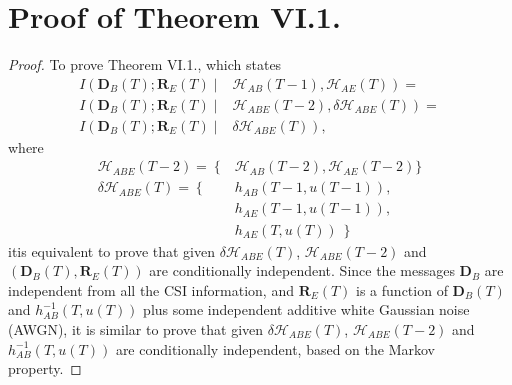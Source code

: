 \newpage
\section*{Proof of Theorem VI.1.}
\begin{proof}
To prove Theorem VI.1., which states
\begin{align*}
    I\left(\mathbf{D}_B(T);\mathbf{R}_E(T) \mid \right. & \left. \mathcal{H}_{AB}(T-1),\mathcal{H}_{AE}(T)\right) =  \nonumber \\
    I\left(\mathbf{D}_B(T);\mathbf{R}_E(T) \mid \right. & \left. \mathcal{H}_{ABE}\left(T-2\right), \delta \mathcal{H}_{ABE}(T) \right) = \nonumber \\
    I\left(\mathbf{D}_B(T);\mathbf{R}_E(T) \mid \right. & \left. \delta \mathcal{H}_{ABE}(T)\right),
\end{align*}
where 
\begin{align*}
\mathcal{H}_{ABE}(T-2) = \left\{ \right. & \left. \mathcal{H}_{AB}\left(T-2\right), \right. \left. \mathcal{H}_{AE}\left(T-2\right) \right. \}\\
\delta \mathcal{H}_{ABE}(T) = \left\{ \right. & \left. h_{AB}\left(T-1, u(T-1)\right), \right. \\
& \left. h_{AE}\left(T-1, u(T-1)\right), \right.\\
& \left. h_{AE}\left(T, u(T)\right)\ \right\}
\end{align*}
itis equivalent to prove that given $\delta \mathcal{H}_{ABE}(T)$, $\mathcal{H}_{ABE}(T-2)$ and $\left(\mathbf{D}_B(T),\mathbf{R}_E(T)\right)$ are conditionally independent. Since the messages $\mathbf{D}_B$ are independent from all the CSI information, and $\mathbf{R}_E(T)$ is a function of $\mathbf{D}_B(T)$ and $h_{AB}^{-1}\left(T,u(T)\right)$ plus some independent additive white Gaussian noise (AWGN), it is similar to prove that given $\delta \mathcal{H}_{ABE}(T)$, $\mathcal{H}_{ABE}(T-2)$ and $h_{AB}^{-1}(T,u(T))$ are conditionally independent, based on the Markov property.


\end{proof}
